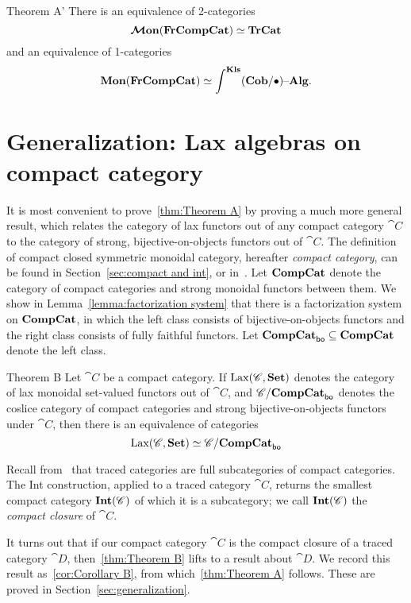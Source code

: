 \documentclass[12pt,oneside,article,draft]{memoir}
\begin{document}
\begin{named}{Theorem A'}
	There is an equivalence of 2-categories
	\[
		\bm{\mathcal{M}}\mathbf{on}(\mathbf{FrCompCat})\simeq\mathbf{TrCat}
	\]
	and an equivalence of 1-categories
	\[
		\mathbf{Mon}(\mathbf{FrCompCat})\simeq\int^{\mathbf{Kls}}(\mathbf{Cob}/\bullet){\text \textendash}\mathbf{Alg}.
	\]
\end{named}


\section{Generalization: Lax algebras on compact category}

It is most convenient to prove~\ref{thm:Theorem A} by proving a much more general result, which relates the category of lax functors out of any compact category $\cat{C}$ to the category of strong, bijective-on-objects functors out of $\cat{C}$.
The definition of compact closed symmetric monoidal category, hereafter \emph{compact category}, can be found in Section~\ref{sec:compact and int}, or in~\cite{MacLane}.
Let $\mathbf{CompCat}$ denote the category of compact categories and strong monoidal functors between them.
We show in Lemma~\ref{lemma:factorization system} that there is a factorization system on $\mathbf{CompCat}$, in which the left class consists of bijective-on-objects functors and the right class consists of fully faithful functors.
Let $\mathbf{CompCat}_{\mathsf{bo}}\subseteq\mathbf{CompCat}$ denote the left class.

\begin{named}{Theorem B}
	Let $\cat{C}$ be a compact category.
	If $\operatorname{Lax}(\mathscr{C},\mathbf{Set})$ denotes the category of lax monoidal set-valued functors out of $\cat{C}$, and $\mathscr{C}/\mathbf{CompCat}_{\mathsf{bo}}$ denotes the coslice category of compact categories and strong bijective-on-objects functors under $\cat{C}$, then there is an equivalence of categories
	\begin{equation}\label{dia:compact lax strong}
		\operatorname{Lax}(\mathscr{C},\mathbf{Set})\simeq\mathscr{C}/\mathbf{CompCat}_{\mathsf{bo}}
	\end{equation}
\end{named}

Recall from~\cite{JoyalStreetVerity} that traced categories are full subcategories of compact categories.
The Int construction, applied to a traced category $\cat{C}$, returns the smallest compact category $\mathbf{Int}(\mathscr{C})$ of which it is a subcategory; we call $\mathbf{Int}(\mathscr{C})$ the \emph{compact closure} of $\cat{C}$.

It turns out that if our compact category $\cat{C}$ is the compact closure of a traced category $\cat{D}$, then~\ref{thm:Theorem B} lifts to a result about $\cat{D}$.
We record this result as~\ref{cor:Corollary B}, from which~\ref{thm:Theorem A} follows.
These are proved in Section~\ref{sec:generalization}.
\end{document}
